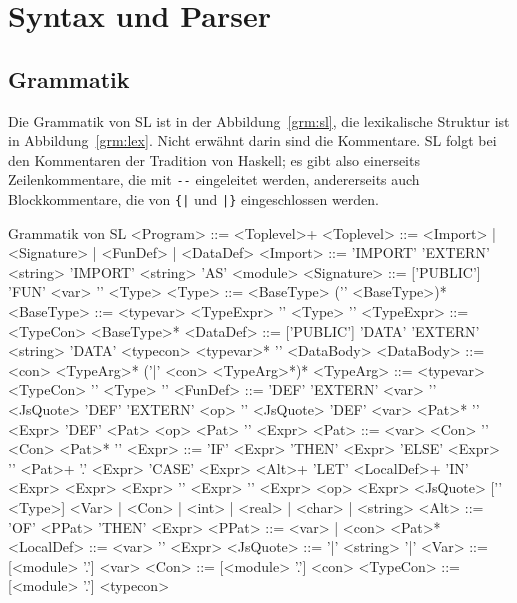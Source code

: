 \documentclass[runningheads]{llncs}
\begin{document}
\section{Syntax und Parser}
\label{sec:syntax}

\subsection{Grammatik}

Die Grammatik von SL ist in der Abbildung~\ref{grm:sl}, die
lexikalische Struktur ist in Abbildung~\ref{grm:lex}. Nicht erwähnt
darin sind die Kommentare.  SL folgt bei den Kommentaren der Tradition
von Haskell; es gibt also einerseits Zeilenkommentare,
die  mit \verb|--| eingeleitet werden, andererseits auch Blockkommentare, die
von \verb:{|: und \verb:|}: eingeschlossen werden.

\begin{grammarfigure}[grm:sl]{Grammatik von SL}
<Program>   ::= <Toplevel>+
<Toplevel>  ::= <Import> | <Signature> | <FunDef> | <DataDef>
<Import>    ::= 'IMPORT' 'EXTERN' <string>
           \alt 'IMPORT' <string> 'AS' <module>
<Signature> ::= ['PUBLIC'] 'FUN' <var> '\colon' <Type>
<Type>      ::= <BaseType> ('\arrow' <BaseType>)*
<BaseType>  ::= <typevar> 
           \alt <TypeExpr> 
           \alt '\open' <Type> '\close'
<TypeExpr>  ::= <TypeCon> <BaseType>*
<DataDef>   ::= ['PUBLIC'] 'DATA' 'EXTERN' <string>
           \alt ['PUBLIC'] 'DATA' <typecon> <typevar>* '\eq' <DataBody>
<DataBody>  ::= <con> <TypeArg>* ('\bar' <con> <TypeArg>*)*
<TypeArg>   ::= <typevar>
           \alt <TypeCon>
           \alt '\open' <Type> '\close'
<FunDef>    ::= 'DEF' 'EXTERN' <var> '\eq' <JsQuote>
           \alt 'DEF' 'EXTERN' <op> '\eq' <JsQuote>
           \alt 'DEF' <var> <Pat>* '\eq' <Expr>
           \alt 'DEF' <Pat> <op> <Pat> '\eq' <Expr>
<Pat>       ::= <var>
           \alt <Con>
           \alt '\open' <Con> <Pat>* '\close'
<Expr>      ::= 'IF' <Expr> 'THEN' <Expr> 'ELSE' <Expr>
           \alt '\lam' <Pat>+ '.' <Expr>
           \alt 'CASE' <Expr> <Alt>+
           \alt 'LET' <LocalDef>+ 'IN' <Expr>
           \alt <Expr> <Expr>
           \alt '\open' <Expr> '\close'
           \alt <Expr> <op> <Expr>
           \alt <JsQuote> ['\colon' <Type>]
           \alt <Var> | <Con> | <int> | <real> | <char> | <string>
<Alt>       ::= 'OF' <PPat> 'THEN' <Expr>
<PPat>      ::= <var> | <con> <Pat>*
<LocalDef>  ::= <var> '\eq' <Expr>
<JsQuote>   ::= '\bropen\bar' <string> '\bar\brclose'
<Var>       ::= [<module> '.'] <var>
<Con>       ::= [<module> '.'] <con>
<TypeCon>   ::= [<module> '.'] <typecon>
\end{grammarfigure}
\end{document}
